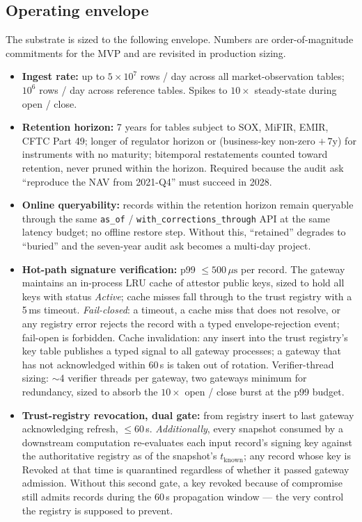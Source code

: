 \documentclass[11pt,a4paper]{article}
\begin{document}
\subsection*{Operating envelope}\label{sec:openv}
The substrate is sized to the following envelope. Numbers are order-of-magnitude commitments for the MVP and are revisited in production sizing.
\begin{footnotesize}
\begin{itemize}
\item \textbf{Ingest rate:} up to $5 \times 10^7$ rows / day across all market-observation tables; $10^6$ rows / day across reference tables. Spikes to $10\times$ steady-state during open / close.
\item \textbf{Retention horizon:} 7 years for tables subject to SOX, MiFIR, EMIR, CFTC Part 49; longer of regulator horizon or (business-key non-zero $+\,7$y) for instruments with no maturity; bitemporal restatements counted toward retention, never pruned within the horizon. Required because the audit ask ``reproduce the NAV from 2021-Q4'' must succeed in 2028.
\item \textbf{Online queryability:} records within the retention horizon remain queryable through the same \texttt{as\_of} / \texttt{with\_corrections\_through} API at the same latency budget; no offline restore step. Without this, ``retained'' degrades to ``buried'' and the seven-year audit ask becomes a multi-day project.
\item \textbf{Hot-path signature verification:} p99 $\le 500\,\mu\text{s}$ per record. The gateway maintains an in-process LRU cache of attestor public keys, sized to hold all keys with status \emph{Active}; cache misses fall through to the trust registry with a 5\,ms timeout. \emph{Fail-closed}: a timeout, a cache miss that does not resolve, or any registry error rejects the record with a typed envelope-rejection event; fail-open is forbidden. Cache invalidation: any insert into the trust registry's key table publishes a typed signal to all gateway processes; a gateway that has not acknowledged within 60\,s is taken out of rotation. Verifier-thread sizing: $\sim$4 verifier threads per gateway, two gateways minimum for redundancy, sized to absorb the $10\times$ open / close burst at the p99 budget.
\item \textbf{Trust-registry revocation, dual gate:} from registry insert to last gateway acknowledging refresh, $\le 60$\,s. \emph{Additionally}, every snapshot consumed by a downstream computation re-evaluates each input record's signing key against the authoritative registry as of the snapshot's $t_{\text{known}}$; any record whose key is Revoked at that time is quarantined regardless of whether it passed gateway admission. Without this second gate, a key revoked because of compromise still admits records during the 60\,s propagation window --- the very control the registry is supposed to prevent.

\end{itemize}
\end{footnotesize}
\end{document}
